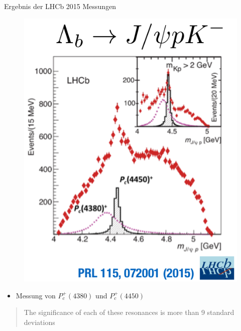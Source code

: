\documentclass[aspectratio=169]{beamer} %
\begin{document}
    \begin{frame}{Ergebnis der LHCb 2015 Messungen}
      \begin{minipage}{0.38\textwidth}
      \begin{figure}\includegraphics[width=\textwidth, height=0.8\textheight, keepaspectratio]{lhcb-pc4450.png}
        \\\cite{Aaij.2015}\end{figure}
      \end{minipage}
      \hfill
      \begin{minipage}{0.6\textwidth}
        \begin{itemize}
          \item Messung von $P_c^+(4380)$ und $P_c^+(4450)$
        \end{itemize}
        \vspace{2em}
        \begin{quote}\glqq The significance of each of these resonances is more than 9 standard deviations\grqq~\end{quote}~\cite[S.~1]{Aaij.2015}
      \end{minipage}
    \end{frame}
\end{document}
